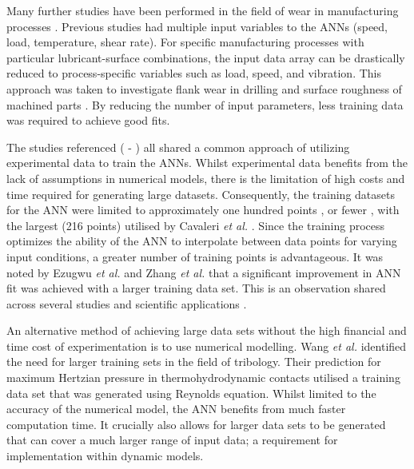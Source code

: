 Many further studies have been performed in the field of wear in manufacturing processes \cite{Ripa2004}. Previous studies had multiple input variables to the ANNs (speed, load, temperature, shear rate). For specific manufacturing processes with particular lubricant-surface combinations, the input data array can be drastically reduced to process-specific variables such as load, speed, and vibration. This approach was taken to investigate flank wear in drilling \cite{Panda2008} and surface roughness of machined parts \cite{Asilturk2011}. By reducing the number of input parameters, less training data was required to achieve good fits.

The studies referenced (\cite{Ezugwu1995} - \cite{Asilturk2011}) all shared a common approach of utilizing experimental data to train the ANNs. Whilst experimental data benefits from the lack of assumptions in numerical models, there is the limitation of high costs and time required for generating large datasets. Consequently, the training datasets for the ANN were limited to approximately one hundred points \cite{Zhang2002} \cite{Hayajneh2009}, or fewer \cite{Ezugwu1995} \cite{Rutherford1996}, with the largest (216 points) utilised by Cavaleri \textit{et al.} \cite{Cavaleri2019}. Since the training process optimizes the ability of the ANN to interpolate between data points for varying input conditions, a greater number of training points is advantageous. It was noted by Ezugwu \textit{et al.} \cite{Ezugwu1995} and Zhang \textit{et al.} \cite{Zhang2002} that a significant improvement in ANN fit was achieved with a larger training data set. This is an observation shared across several studies and scientific applications \cite{Barbedo2018}.

An alternative method of achieving large data sets without the high financial and time cost of experimentation is to use numerical modelling. Wang \textit{et al.} \cite{Wang2020} identified the need for larger training sets in the field of tribology. Their prediction for maximum Hertzian pressure in thermohydrodynamic contacts utilised a training data set that was generated using Reynolds equation. Whilst limited to the accuracy of the numerical model, the ANN benefits from much faster computation time. It crucially also allows for larger data sets to be generated that can cover a much larger range of input data; a requirement for implementation within dynamic models.

